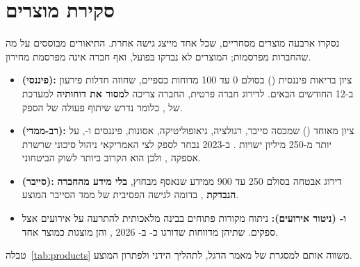 \section{סקירת מוצרים}\label{sec:products}

נסקרו ארבעה מוצרים מסחריים, שכל אחד מייצג גישה אחרת. התיאורים מבוססים על מה שהחברות מפרסמות; המוצרים לא נבדקו בפועל, ואף חברה אינה מפרסמת מחירון.
\begin{itemize}
\item \textbf{ (פיננסי):} ציון בריאות פיננסית () בסולם 0 עד 100 מדוחות כספיים, שחוזה חדלות פירעון ב-12 החודשים הבאים. לדירוג חברה פרטית, החברה צריכה \textbf{למסור את דוחותיה} למערכת של  \cite{rrfaq}, כלומר נדרש שיתוף פעולה של הספק.
\item \textbf{ (רב-ממדי):} ציון מאוחד () שמכסה סייבר, רגולציה, גיאופוליטיקה, אסונות, פיננסים ו-, על יותר מ-250 מיליון ישויות \cite{interosgov}. ב-2023 נבחר לספק לצי האמריקאי ניהול סיכוני שרשרת אספקה \cite{interosnavy2023}, ולכן הוא הקרוב ביותר לשוק הביטחוני.
\item \textbf{ (סייבר):} דירוג אבטחה בסולם 250 עד 900 ממידע שנאסף מבחוץ, \textbf{בלי מידע מהחברה הנבדקת} \cite{bitsight2026}, בדומה לגישה הפסיבית של ממד הסייבר המוצע.
\item \textbf{ ו- (ניטור אירועים):} ניתוח מקורות פתוחים בבינה מלאכותית להתרעה על אירועים אצל ספקים. שתיהן מדווחות שדורגו כ- ב- 2026 \cite{everstream2026,prewave2026}, והן מוצגות כמוצר אחד.
\end{itemize}

טבלה~\ref{tab:products} משווה אותם למסגרת  של מאמר הדגל, לתהליך הידני ולפתרון המוצע.


